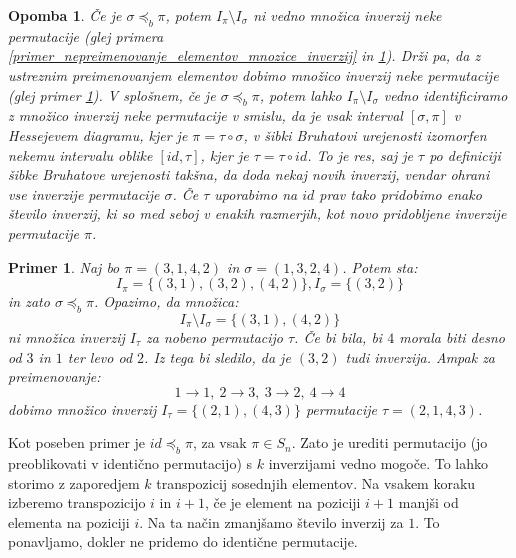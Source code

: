 \documentclass[a4paper, 12pt]{book}
\newtheorem{primer}{Primer}[chapter]
\newtheorem{opomba}{Opomba}[chapter]
\begin{document}
\begin{opomba}
    Če je $\sigma \preceq_b \pi$, potem $I_{\pi} \setminus I_{\sigma}$ ni vedno množica inverzij neke permutacije (glej primera \ref{primer_nepreimenovanje_elementov_mnozice_inverzij} in \ref{primer_preimenovanje_elementov_mnozice_inverzij}). Drži pa, da z ustreznim preimenovanjem elementov dobimo množico inverzij neke permutacije (glej primer \ref{primer_preimenovanje_elementov_mnozice_inverzij}). V splošnem, če je $\sigma \preceq_b \pi$, potem lahko $I_{\pi} \setminus I_{\sigma}$ vedno identificiramo z množico inverzij neke permutacije v smislu, da je vsak interval $[\sigma, \pi]$ v Hessejevem diagramu, kjer je $\pi = \tau \circ \sigma$, v šibki Bruhatovi urejenosti izomorfen nekemu intervalu oblike $[id, \tau]$, kjer je $\tau = \tau \circ id$. To je res, saj je $\tau$ po definiciji šibke Bruhatove urejenosti takšna, da doda nekaj novih inverzij, vendar ohrani vse inverzije permutacije $\sigma$. Če $\tau$ uporabimo na $id$ prav tako pridobimo enako število inverzij, ki so med seboj v enakih razmerjih, kot novo pridobljene inverzije permutacije $\pi$.
\end{opomba}

\begin{primer}
\label{primer_preimenovanje_elementov_mnozice_inverzij}
    Naj bo $\pi = (3, 1, 4, 2)$ in $\sigma = (1, 3, 2, 4)$. Potem sta:
    \[I_{\pi} = \{ (3, 1), (3, 2), (4, 2) \}, I_{\sigma} = \{ (3, 2) \}\]
    in zato $\sigma \preceq_b \pi$. Opazimo, da množica:
    \[
        I_{\pi} \setminus I_{\sigma} = \{ (3, 1), (4, 2) \}
    \]
    ni množica inverzij $I_{\tau}$ za nobeno permutacijo $\tau$. Če bi bila, bi $4$ morala biti desno od $3$ in $1$ ter levo od $2$. Iz tega bi sledilo, da je $(3, 2)$ tudi inverzija. Ampak za preimenovanje:
    \[
        1 \rightarrow 1, \ 2 \rightarrow 3, \ 3 \rightarrow 2, \ 4 \rightarrow 4 
    \]
    dobimo množico inverzij $I_{\tau} = \{ (2, 1), (4, 3)\}$ permutacije $\tau = (2, 1, 4, 3)$.
\end{primer}

Kot poseben primer je $id \preceq_b \pi$, za vsak $\pi \in S_n$. Zato je urediti permutacijo (jo preoblikovati v identično permutacijo) s $k$ inverzijami vedno mogoče. To lahko storimo z zaporedjem $k$ transpozicij sosednjih elementov. Na vsakem koraku izberemo transpozicijo $i$ in $i+1$, če je element na poziciji $i+1$ manjši od elementa na poziciji $i$. Na ta način zmanjšamo število inverzij za $1$. To ponavljamo, dokler ne pridemo do identične permutacije.
\end{document}
